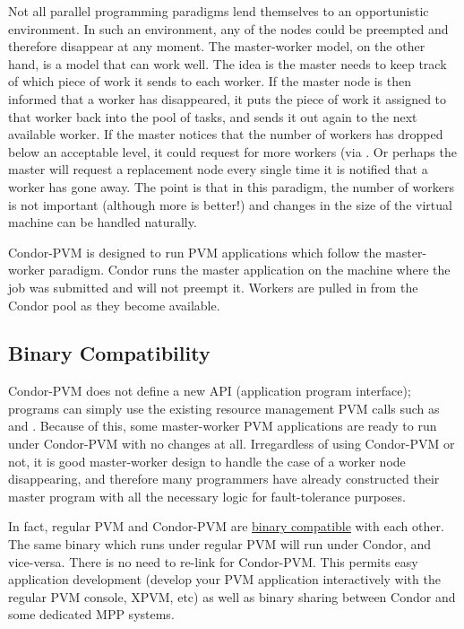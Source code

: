 Not all parallel programming paradigms lend themselves to an
opportunistic environment. In such an environment, any of the nodes
could be preempted and therefore disappear at any moment. The
master-worker model, on the other hand, is a model that can work well.
The idea is the master needs to keep track of which piece of work it
sends to each worker. If the master node is then informed that a worker
has disappeared, it puts the piece of work it assigned to that worker
back into the pool of tasks, and sends it out again to the next
available worker. If the master notices that the number of workers has
dropped below an acceptable level, it could request for more workers
(via . Or perhaps the master will request
a replacement node every single time it is notified that a worker has
gone away. The point is that in this paradigm, the number of workers is
not important (although more is better!) and changes in the size of
the virtual machine can be handled naturally.

Condor-PVM is designed to run PVM applications which follow the
master-worker paradigm.  Condor runs the master application on the
machine where the job was submitted and will not preempt it.  Workers
are pulled in from the Condor pool as they become available.

\subsection{Binary Compatibility}

Condor-PVM does not define a new API (application program interface);
programs can simply use the existing resource management PVM calls such
as  and .  Because of this, some
master-worker PVM applications are ready to run under Condor-PVM with no
changes at all.  Irregardless of using Condor-PVM or not, it is good
master-worker design to handle the case of a worker node disappearing,
and therefore many programmers have already constructed their master program
with all the necessary logic for fault-tolerance purposes.  

In fact, regular PVM and Condor-PVM are \underline{binary compatible}
with each other.  The same binary which runs under regular PVM will run
under Condor, and vice-versa.  There is no need to re-link for Condor-PVM.
This permits easy application development
(develop your PVM application interactively with the regular PVM console, XPVM,
etc) as well as binary sharing between Condor and some dedicated MPP systems.

